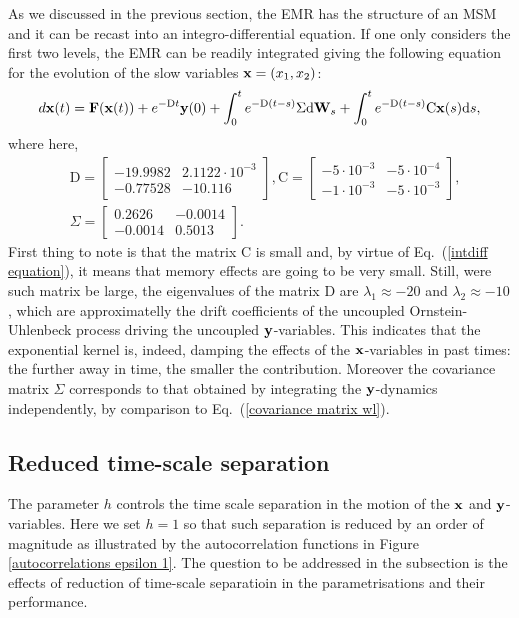 \documentclass[12pt]{article}
\begin{document}
As we discussed in the previous section, the EMR has the structure of an MSM and it can be recast into an integro-differential equation. If one only considers the first two levels, the EMR can be readily integrated giving the following equation for the evolution of the slow variables $\mathbf{x} = (x_1,x_2)$:
\begin{equation}\label{intdiff equation}
d\mathbf{x}(t) =\mathbf{F} (\mathbf{x}(t)) + e^{-\mathrm{D}t}\mathbf{y} (0) + \int _{0}^te^{-\mathrm{D}(t-s)} \Sigma \mathrm{d} \mathbf{W}_s + \int _{0}^{t}e^{-\mathrm{D}(t-s)}\mathrm{C}\mathbf{x}(s)\mathrm{d} s,
\end{equation}
where here,
\begin{align}
	&\mathrm{D}=\begin{bmatrix}
	-19.9982 & 2.1122\cdot 10^{-3}  \\ 
	-0.77528 & -10.116
	\end{bmatrix}, \mathrm{C}=\begin{bmatrix}
	-5\cdot 10^{-3} & -5\cdot 10^{-4}\\
	-1\cdot 10^{-3} & -5\cdot 10^{-3} 
	\end{bmatrix}, 
\\
	&\Sigma =\begin{bmatrix}
	0.2626 & -0.0014  \\ 
	-0.0014 & 0.5013
	\end{bmatrix}.
\end{align}
First thing to note is that the matrix $\mathrm{C}$ is small and, by virtue of Eq.~(\ref{intdiff equation}), it means that memory effects are going to be very small. Still, were such matrix be large, the eigenvalues of the matrix $\mathrm{D}$ are $\lambda _1 \approx -20$ and $\lambda _2 \approx -10$, which are approximatelly the drift coefficients of the uncoupled Ornstein-Uhlenbeck process driving the uncoupled $\mathbf{y}$-variables. This indicates that the exponential kernel is, indeed, damping the effects of the $\mathbf{x}$-variables in past times: the further away in time, the smaller the contribution. Moreover the covariance matrix $\Sigma$ corresponds to that obtained by integrating the $\mathbf{y}$-dynamics independently, by comparison to Eq.~({\ref{covariance matrix wl}}).

\subsection{Reduced time-scale separation }

The parameter $h$ controls the time scale separation in the motion of the $\mathbf{x}$ and $\mathbf{y}$-variables. Here we set $h=1$ so that such separation is reduced by an order of magnitude as illustrated by the autocorrelation functions in Figure \ref{autocorrelations epsilon 1}. The question to be addressed in the subsection is the effects of reduction of time-scale separatioin in the parametrisations and their performance.
\end{document}
